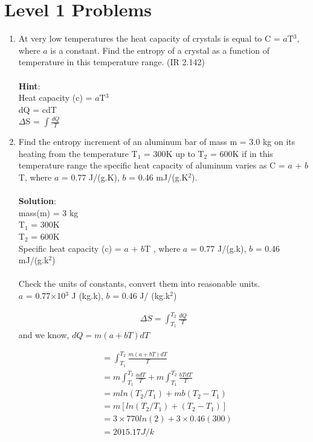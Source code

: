 \section{Level 1 Problems}
\begin{enumerate}
    \item At very low temperatures the heat capacity of crystals is equal to C = $a$T$^3$, where $a$ is a constant. Find the entropy of a crystal as a function of temperature in this temperature range. (IR 2.142)  \\\\
    \textbf{Hint}: \\
    Heat capacity (c) = $a$T$^3$ \\dQ  =  cdT \\$\Delta$S = $\int \frac{dQ}{T}$
    
    \item Find the entropy increment of an aluminum bar of mass m = 3.0 kg on its heating from the temperature T$_1$ = 300K up to T$_2$ = 600K if in this temperature range the specific heat capacity of aluminum varies as C = $a$ + $b$T, where $a$ = 0.77 J/(g.K), $b$ = 0.46 mJ/(g.K$^2$). \\\\
    \textbf{Solution}:\\
    mass(m) = 3 kg \\T$_1$ = 300K \\T$_2$ = 600K \\Specific heat capacity (c) = $a$ + $b$T , where $a$ = 0.77 J/(g.k), $b$ = 0.46 mJ/(g.k$^2$) \\\\
    Check the units of constants, convert them into reasonable units. \\
    $a$ = 0.77$\times$10$^3$ J (kg.k),   $b$ = 0.46 J/ (kg.k$^2$) 
    
    \begin{align*}
        \Delta S = \int_{T_1}^{T_2} \frac{dQ}{T} 
    \end{align*}
and we know, $dQ = m(a + bT)dT$

\begin{align*}
    &= \int_{T_1}^{T_2}\frac{m(a + bT)dT}{T}\\
    &= m\int_{T_1}^{T_2}\frac{adT}{T} + m\int_{T_1}^{T_2}\frac{bTdT}{T}\\
    &= m ln(T_2/T_1) + m b (T_2 - T_1)\\
    &= m[ln(T_2/T_1) + (T_2 - T_1)]\\
    &= 3\times770ln(2) + 3\times0.46(300)\\
    &= 2015.17 J/k 
\end{align*}


\end{enumerate}
